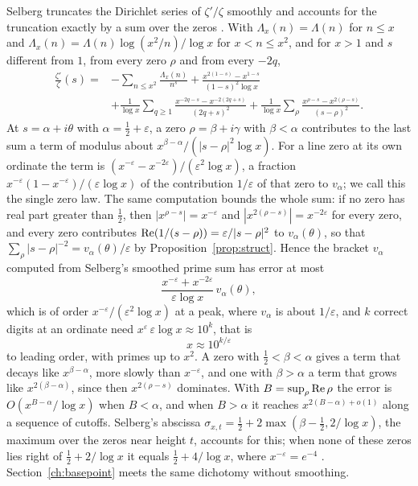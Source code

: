 Selberg \cite{Selberg46} truncates the Dirichlet series of $\zeta'/\zeta$ smoothly and accounts for the truncation exactly by a sum over the zeros \cite[Section 14.20]{Titchmarsh}. With $\Lambda_x(n)=\Lambda(n)$ for $n\le x$ and $\Lambda_x(n)=\Lambda(n)\log(x^2/n)/\log x$ for $x<n\le x^2$, and for $x>1$ and $s$ different from $1$, from every zero $\rho$ and from every $-2q$,
\begin{equation}\label{eq:ch10:selberg}
\begin{split}
\frac{\zeta'}{\zeta}(s)={}&-\sum_{n\le x^2}\frac{\Lambda_x(n)}{n^s}+\frac{x^{2(1-s)}-x^{1-s}}{(1-s)^2\log x}\\
&+\frac1{\log x}\sum_{q\ge1}\frac{x^{-2q-s}-x^{-2(2q+s)}}{(2q+s)^2}+\frac1{\log x}\sum_\rho\frac{x^{\rho-s}-x^{2(\rho-s)}}{(s-\rho)^2}.
\end{split}
\end{equation}
At $s=\alpha+i\theta$ with $\alpha=\tfrac12+\varepsilon$, a zero $\rho=\beta+i\gamma$ with $\beta<\alpha$ contributes to the last sum a term of modulus about $x^{\beta-\alpha}/(|s-\rho|^2\log x)$. For a line zero at its own ordinate the term is $(x^{-\varepsilon}-x^{-2\varepsilon})/(\varepsilon^2\log x)$, a fraction $x^{-\varepsilon}(1-x^{-\varepsilon})/(\varepsilon\log x)$ of the contribution $1/\varepsilon$ of that zero to $v_\alpha$; we call this the single zero law. The same computation bounds the whole sum: if no zero has real part greater than $\tfrac12$, then $|x^{\rho-s}|=x^{-\varepsilon}$ and $|x^{2(\rho-s)}|=x^{-2\varepsilon}$ for every zero, and every zero contributes $\operatorname{Re}(1/(s-\rho))=\varepsilon/|s-\rho|^2$ to $v_\alpha(\theta)$, so that $\sum_\rho|s-\rho|^{-2}=v_\alpha(\theta)/\varepsilon$ by Proposition~\ref{prop:struct}. Hence the bracket $v_\alpha$ computed from Selberg's smoothed prime sum has error at most
\[
\frac{x^{-\varepsilon}+x^{-2\varepsilon}}{\varepsilon\log x}\,v_\alpha(\theta),
\]
which is of order $x^{-\varepsilon}/(\varepsilon^2\log x)$ at a peak, where $v_\alpha$ is about $1/\varepsilon$, and $k$ correct digits at an ordinate need $x^\varepsilon\,\varepsilon\log x\approx10^k$, that is
\[
x\approx10^{k/\varepsilon}
\]
to leading order, with primes up to $x^2$. A zero with $\tfrac12<\beta<\alpha$ gives a term that decays like $x^{\beta-\alpha}$, more slowly than $x^{-\varepsilon}$, and one with $\beta>\alpha$ a term that grows like $x^{2(\beta-\alpha)}$, since then $x^{2(\rho-s)}$ dominates. With $B=\sup_\rho\operatorname{Re}\rho$ the error is $O(x^{B-\alpha}/\log x)$ when $B<\alpha$, and when $B>\alpha$ it reaches $x^{2(B-\alpha)+o(1)}$ along a sequence of cutoffs. Selberg's abscissa $\sigma_{x,t}=\tfrac12+2\max(\beta-\tfrac12,2/\log x)$, the maximum over the zeros near height $t$, accounts for this; when none of these zeros lies right of $\tfrac12+2/\log x$ it equals $\tfrac12+4/\log x$, where $x^{-\varepsilon}=e^{-4}$ \cite{Selberg46}. Section~\ref{ch:basepoint} meets the same dichotomy without smoothing.

